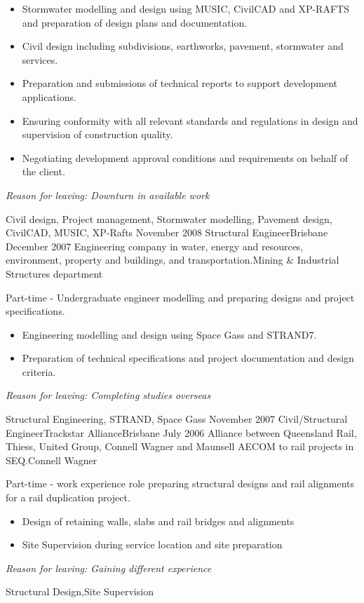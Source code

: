 \begin{experiences}
{\begin{itemize}
		\item Stormwater modelling and design using MUSIC, CivilCAD and XP-RAFTS and preparation of design plans and documentation.
		\item Civil design including subdivisions, earthworks, pavement, stormwater and services.
		\item Preparation and submissions of technical reports to support development applications.
		\item Ensuring conformity with all relevant standards and regulations in design and supervision of construction quality.
		\item Negotiating development approval conditions and requirements on behalf of the client.
               \end{itemize}
                    \textit{Reason for leaving: Downturn in available work}
                    }
                    {Civil design, Project management, Stormwater modelling, Pavement design, CivilCAD, MUSIC, XP-Rafts }
  \emptySeparator
  \consultantexperience
  {November 2008}      {Structural Engineer}{}{Brisbane}
  {December 2007}      {Engineering company in water, energy and resources, environment, property and buildings, and transportation.}{Mining \& Industrial Structures department}
   { Part-time - Undergraduate engineer modelling and preparing designs and project specifications.
                    
        \begin{itemize}
		\item Engineering modelling and design using Space Gass and STRAND7.
		\item Preparation of technical specifications and project documentation and design criteria.
               \end{itemize}
                    \textit{Reason for leaving: Completing studies overseas}
                    }
                    {Structural Engineering, STRAND, Space Gass} 
  \emptySeparator   
  \consultantexperience
  {November 2007}    {Civil/Structural Engineer}{Trackstar Alliance}{Brisbane}
  {July 2006}       {Alliance between Queensland Rail, Thiess, United Group, Connell Wagner and Maunsell AECOM to rail projects in SEQ.}{Connell Wagner}
  		{Part-time - work experience role preparing structural designs and rail alignments for a rail duplication project.                 
                      \begin{itemize}
		\item Design of retaining walls, slabs and rail bridges and alignments
		\item Site Supervision during service location and site preparation
                      \end{itemize}
                    \textit{Reason for leaving: Gaining different experience}
                    }
                    {Structural Design,Site Supervision}   
  \emptySeparator            
\end{experiences}
